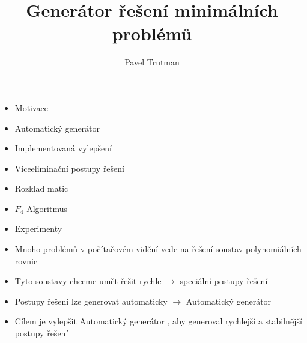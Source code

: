 \documentclass[cmpiitalkstyle, 25pt]{cmptalk}
\author{Pavel Trutman}
\affiliation{Centrum strojového vnímání}
\title{Generátor řešení minimálních problémů}
\begin{document}
\bigfigfalse
\maketalktitlepage

\begin{cmptalkslide}[Obsah]
  \begin{itemize}
    \item Motivace
    \item Automatický generátor
    \item Implementovaná vylepšení
    \end{itemize}
    \begin{narrow}[2]
    \begin{itemize}
      \item Víceeliminační postupy řešení
      \item Rozklad matic
      \item $F_4$ Algoritmus
    \end{itemize}
    \end{narrow}
    \begin{itemize}
    \item Experimenty
  \end{itemize}
\end{cmptalkslide}

\begin{cmptalkslide}[Motivace]
  \begin{itemize}
    \item Mnoho problémů v počítačovém vidění vede na řešení soustav polynomiálních rovnic
    \item Tyto soustavy chceme umět řešit rychle $\rightarrow$ speciální postupy řešení
    \item Postupy řešení lze generovat automaticky $\rightarrow$ Automatický generátor \cite{AutoGen}
    \item Cílem je vylepšit Automatický generátor \cite{AutoGen}, aby generoval rychlejší a stabilnější postupy řešení
  \end{itemize}
\end{cmptalkslide}
\end{document}

